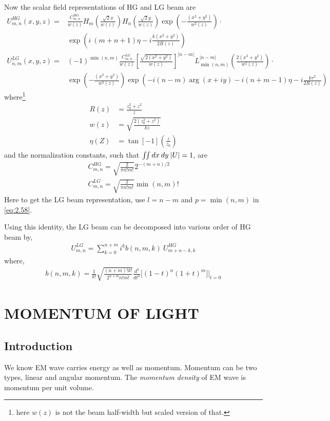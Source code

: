 \documentclass[11pt,a4paper]{article}
\numberwithin{equation}{section}
\begin{document}
Now the scalar field representations of HG and LG beam are
\begin{align}
	U_{m,n}^{HG}(x,y,z)=& \frac{C_{m,n}^{HG}}{w(z)} H_m\left(\frac{\sqrt{2} x}{w(z)}\right) H_n\left(\frac{\sqrt{2} y}{w(z)}\right)\exp( -\frac{(x^2+y^2)}{w^2(z)}) \cdot\nonumber\\ 
	&\exp( i\:(m+n+1)\eta -i\frac{k(x^2+y^2)}{2R(z)}) \\
	U_{n,m}^{LG}(x,y,z)=&(-1)^{\min(n,m)}\frac{C_{m,n}^{LG}}{w(z)} \left[\frac{\sqrt{2(x^2+y^2)}}{w(z)}\right]^{|n-m|} L_{\min(n,m)}^{|n-m|}\left(\frac{2(x^2+y^2)}{w^2(z)}\right)\cdot\nonumber\\&\exp(-\frac{(x^2+y^2)}{w^2(z)}) \exp(-i(n-m)\arg(x+iy)-i(n+m-1)\eta-i\frac{kr^2}{2R(z)}) 
\end{align}
where\footnote{here $w(z)$ is not the beam half-width but scaled version of that.}
\begin{align}
	R(z)&= \frac{z_0^2+z^2}{z}\\
	w(z)&= \sqrt{\frac{2(z_0^2+z^2)}{kz}}\\
	\eta(Z)&= \tan[-1](\frac{z}{z_0})
\end{align}
and the normalization constants, such that $\iint dx\:dy\: \abs{U}=1$, are
\begin{align}
	C_{m,n}^{HG}=\sqrt{\frac{2}{\pi n!m!}}2^{-(m+n)/2}\\
	C_{m,n}^{LG}=\sqrt{\frac{2}{\pi n!m!}}\min(n,m)!
\end{align}
Here to get the LG beam representation, use $l=n-m$ and $p=\min(n,m)$ in \ref{eq:2.58}. \cite{allen 99}

Using this identity, the LG beam can be decomposed into various order of HG beam by, \cite{beijers allen 93}
\begin{align}
	U_{m,n}^{LG}= \sum_{k=0}^{n+m}i^k b(n,m,k)\: U_{m+n-k,k}^{HG}
\end{align}
where,
\begin{align}
	b(n,m,k)=\frac{1}{k!}\sqrt{\frac{(n+m)!k!}{2^{n+m}n!m!}} \frac{d^k}{dt^k}\big[(1-t)^n(1+t)^m \big] \bigg|_{t=0}
\end{align}
\clearpage


\section{MOMENTUM OF LIGHT}
\subsection{Introduction}
We know EM wave carries energy as well as momentum. Momentum can be two types, linear and angular momentum. The \textit{momentum density} of EM wave is momentum per unit volume.
\end{document}
